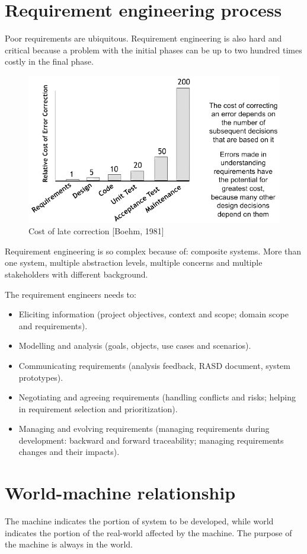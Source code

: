 \documentclass[12pt, a4paper]{report}
\begin{document}
    \section{Requirement engineering process}
    Poor requirements are ubiquitous. Requirement engineering is also hard and critical because a problem with the initial phases can be up to two hundred times costly in the final 
    phase. 
    \begin{figure}[H]
        \centering
        \includegraphics[width=0.75\linewidth]{images/requirements.png}
        \caption{Cost of late correction [Boehm, 1981]}
    \end{figure}
    Requirement engineering is so complex because of: composite systems. More than one system, multiple abstraction levels, multiple concerns and multiple stakeholders with different
    background.
    
    The requirement engineers needs to: 
    \begin{itemize}
        \item Eliciting information (project objectives, context and scope; domain scope and requirements).
        \item Modelling and analysis (goals, objects, use cases and scenarios).
        \item Communicating requirements (analysis feedback, RASD document, system prototypes).
        \item Negotiating and agreeing requirements (handling conflicts and risks; helping in requirement selection and prioritization).
        \item Managing and evolving requirements (managing requirements during development: backward and forward traceability; managing requirements changes and their impacts).
    \end{itemize}

    \section{World-machine relationship}
    The machine indicates the portion of system to be developed, while world indicates the portion of the real-world affected by the machine. The purpose of the machine is always in 
    the world. 
    
\end{document}
